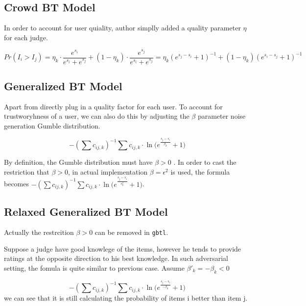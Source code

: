 \documentclass[]{article}
\begin{document}
\hypertarget{crowd-bt-model}{%
\subsection{Crowd BT Model}\label{crowd-bt-model}}

In order to account for user quiality, author simplly added a quality
parameter \(\eta\) for each judge.

\[Pr(I_i > I_j) = \eta_k \cdot \frac{e^{s_i}}{e^{s_i} + e^{s_j}} + ( 1- \eta_k ) \cdot \frac{e^{s_j}}{e^{s_i} + e^{s_j}} 
= \eta_k \left( {e^{s_j - s_i} + 1} \right)^{-1} + (1 -\eta_k) \left( {e^{s_i - s_j} + 1} \right)^{-1} \]

\hypertarget{generalized-bt-model}{%
\subsection{Generalized BT Model}\label{generalized-bt-model}}

Apart from directly plug in a quality factor for each user. To account
for trustworyhness of a user, we can also do this by adjusting the
\(\beta\) parameter noise generation Gumble distribution.

\[-(\sum{c_{ij, k}})^{-1} \sum{c_{ij,k} \cdot \ln({e^{\frac{s_j - s_i}{\beta_k}} + 1}})\]

By definition, the Gumble distribution must have \(\beta > 0\) . In
order to cast the restriction that \(\beta > 0\), in actual
implementation \(\beta = \epsilon^2\) is used, the formula becomes
\(-(\sum{c_{ij, k}})^{-1} \sum{c_{ij,k} \cdot \ln({e^{\frac{s_j - s_i}{\epsilon_k^2}} + 1}})\).

\hypertarget{relaxed-generalized-bt-model}{%
\subsection{Relaxed Generalized BT
Model}\label{relaxed-generalized-bt-model}}

Actually the restrcition \(\beta > 0\) can be removed in \texttt{gbtl}.

Suppose a judge have good knowlege of the items, however he tends to
provide ratings at the opposite direction to his best knowledge. In such
adversarial setting, the fomula is quite similar to previous case.
Assume \(\beta'_k = - \beta_k < 0\)

\[-(\sum{c_{ij, k}})^{-1} \sum{c_{ij,k} \cdot \ln({e^{\frac{s_j - s_i}{-\beta_k}} + 1}})\]
we can see that it is still calculating the probability of items i
better than item j.
\end{document}
